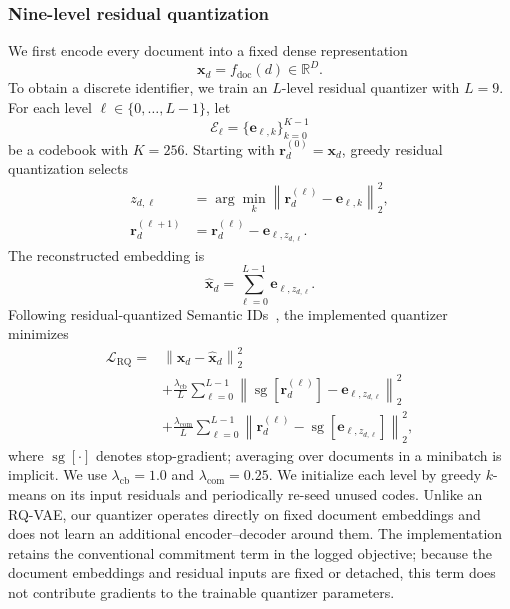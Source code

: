 \subsubsection{Nine-level residual quantization}

We first encode every document into a fixed dense representation
\begin{equation}
    \mathbf{x}_d=f_{\mathrm{doc}}(d)\in\mathbb{R}^{D}.
\end{equation}
To obtain a discrete identifier, we train an $L$-level residual quantizer with $L=9$. For each level $\ell\in\{0,\ldots,L-1\}$, let
\begin{equation}
    \mathcal{E}_{\ell}=\{\mathbf{e}_{\ell,k}\}_{k=0}^{K-1}
\end{equation}
be a codebook with $K=256$. Starting with $\mathbf{r}^{(0)}_d=\mathbf{x}_d$, greedy residual quantization selects
\begin{align}
    z_{d,\ell}
    &=\arg\min_{k}\left\|\mathbf{r}^{(\ell)}_d-\mathbf{e}_{\ell,k}\right\|_2^2, \\
    \mathbf{r}^{(\ell+1)}_d
    &=\mathbf{r}^{(\ell)}_d-\mathbf{e}_{\ell,z_{d,\ell}}.
\end{align}
The reconstructed embedding is
\begin{equation}
    \widehat{\mathbf{x}}_d
    =\sum_{\ell=0}^{L-1}\mathbf{e}_{\ell,z_{d,\ell}}.
\end{equation}
Following residual-quantized Semantic IDs~\citep{lee2022rq,tiger2023}, the implemented quantizer minimizes
\begin{align}
    \mathcal{L}_{\mathrm{RQ}}
    ={}&\left\|\mathbf{x}_d-\widehat{\mathbf{x}}_d\right\|_2^2 \\
    &+\frac{\lambda_{\mathrm{cb}}}{L}
      \sum_{\ell=0}^{L-1}
      \left\|\operatorname{sg}[\mathbf{r}^{(\ell)}_d]
      -\mathbf{e}_{\ell,z_{d,\ell}}\right\|_2^2 \\
    &+\frac{\lambda_{\mathrm{com}}}{L}
      \sum_{\ell=0}^{L-1}
      \left\|\mathbf{r}^{(\ell)}_d
      -\operatorname{sg}[\mathbf{e}_{\ell,z_{d,\ell}}]\right\|_2^2,
\end{align}
where $\operatorname{sg}[\cdot]$ denotes stop-gradient; averaging over documents in a minibatch is implicit. We use $\lambda_{\mathrm{cb}}=1.0$ and $\lambda_{\mathrm{com}}=0.25$. We initialize each level by greedy $k$-means on its input residuals and periodically re-seed unused codes. Unlike an RQ-VAE, our quantizer operates directly on fixed document embeddings and does not learn an additional encoder--decoder around them. The implementation retains the conventional commitment term in the logged objective; because the document embeddings and residual inputs are fixed or detached, this term does not contribute gradients to the trainable quantizer parameters.

